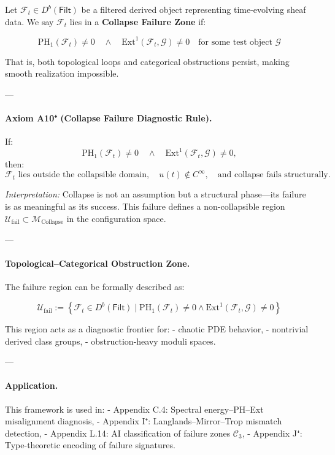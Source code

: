 \documentclass[11pt]{article}
\begin{document}
\begin{axiom}
\begin{axiom}
{{Let \( \mathcal{F}_t \in D^b(\mathsf{Filt}) \) be a filtered derived object representing time-evolving sheaf data.  
We say \( \mathcal{F}_t \) lies in a \textbf{Collapse Failure Zone} if:

\[
\mathrm{PH}_1(\mathcal{F}_t) \ne 0 \quad \land \quad \mathrm{Ext}^1(\mathcal{F}_t, \mathcal{G}) \ne 0 \quad \text{for some test object } \mathcal{G}
\]

That is, both topological loops and categorical obstructions persist, making smooth realization impossible.

---

\paragraph{Axiom A10⁺ (Collapse Failure Diagnostic Rule).}

If:
\[
\mathrm{PH}_1(\mathcal{F}_t) \ne 0 \quad \land \quad \mathrm{Ext}^1(\mathcal{F}_t, \mathcal{G}) \ne 0,
\]
then:
\[
\mathcal{F}_t \text{ lies outside the collapsible domain}, \quad u(t) \notin C^\infty, \quad \text{and collapse fails structurally.}
\]

\textit{Interpretation:} Collapse is not an assumption but a structural phase—its failure is as meaningful as its success.  
This failure defines a non-collapsible region \( \mathcal{U}_{\text{fail}} \subset \mathcal{M}_{\text{Collapse}} \) in the configuration space.

---

\paragraph{Topological–Categorical Obstruction Zone.}

The failure region can be formally described as:

\[
\mathcal{U}_{\text{fail}} := \left\{ \mathcal{F}_t \in D^b(\mathsf{Filt}) \mid \mathrm{PH}_1(\mathcal{F}_t) \ne 0 \land \mathrm{Ext}^1(\mathcal{F}_t, \mathcal{G}) \ne 0 \right\}
\]

This region acts as a diagnostic frontier for:
- chaotic PDE behavior,
- nontrivial derived class groups,
- obstruction-heavy moduli spaces.

---

\paragraph{Application.}  
This framework is used in:
- Appendix C.4: Spectral energy–PH–Ext misalignment diagnosis,
- Appendix I⁺: Langlands–Mirror–Trop mismatch detection,
- Appendix L.14: AI classification of failure zones \( \mathcal{C}_3 \),
- Appendix J⁺: Type-theoretic encoding of failure signatures.

}}
\end{axiom}
\end{axiom}
\end{document}
